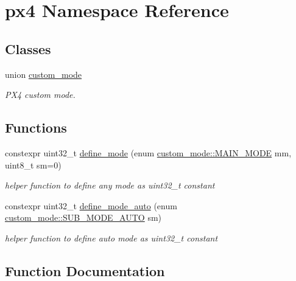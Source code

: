 \hypertarget{namespacepx4}{}\section{px4 Namespace Reference}
\label{namespacepx4}
\subsection*{Classes}
\begin{DoxyCompactItemize}
\item 
union \mbox{\hyperlink{unionpx4_1_1custom__mode}{custom\+\_\+mode}}
\begin{DoxyCompactList}\small\item\em P\+X4 custom mode. \end{DoxyCompactList}\end{DoxyCompactItemize}
\subsection*{Functions}
\begin{DoxyCompactItemize}
\item 
constexpr uint32\+\_\+t \mbox{\hyperlink{namespacepx4_ae0bfd8420118dc5e08dce97b1e4a5cca}{define\+\_\+mode}} (enum \mbox{\hyperlink{unionpx4_1_1custom__mode_ad9d2a8e78d275f102f16fa30fd46bc82}{custom\+\_\+mode\+::\+M\+A\+I\+N\+\_\+\+M\+O\+DE}} mm, uint8\+\_\+t sm=0)
\begin{DoxyCompactList}\small\item\em helper function to define any mode as uint32\+\_\+t constant \end{DoxyCompactList}\item 
constexpr uint32\+\_\+t \mbox{\hyperlink{namespacepx4_ab0934a78cd94a32af9dd05c559911b78}{define\+\_\+mode\+\_\+auto}} (enum \mbox{\hyperlink{unionpx4_1_1custom__mode_af4b9497eeaa602d1677ab9f2c2b16931}{custom\+\_\+mode\+::\+S\+U\+B\+\_\+\+M\+O\+D\+E\+\_\+\+A\+U\+TO}} sm)
\begin{DoxyCompactList}\small\item\em helper function to define auto mode as uint32\+\_\+t constant \end{DoxyCompactList}\end{DoxyCompactItemize}


\subsection{Function Documentation}
\mbox{\label{namespacepx4_ae0bfd8420118dc5e08dce97b1e4a5cca}} 
